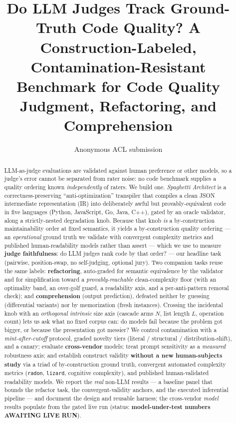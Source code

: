 \documentclass[11pt]{article}
\title{Do LLM Judges Track Ground-Truth Code Quality? A Construction-Labeled,
 Contamination-Resistant Benchmark for Code Quality Judgment, Refactoring, and
 Comprehension}
\author{Anonymous ACL submission}
\begin{document}
\maketitle

\begin{abstract}
LLM-as-judge evaluations are validated against human preference or other models, so a
judge's error cannot be separated from rater noise: no code benchmark supplies a quality
ordering known \emph{independently} of raters. We build one. \emph{Spaghetti Architect}
is a correctness-preserving ``anti-optimization'' transpiler that compiles a clean JSON
intermediate representation (IR) into deliberately awful but provably-equivalent code in
five languages (Python, JavaScript, Go, Java, C++), gated by an oracle validator, along a
strictly-nested degradation knob. Because that knob \emph{is} a by-construction
maintainability order at fixed semantics, it yields a by-construction quality ordering ---
an \emph{operational} ground truth we validate with convergent complexity metrics and
published human-readability models rather than assert --- which we use to measure
\textbf{judge faithfulness}: do LLM judges rank code by that order? --- our headline task
(pairwise, position-swap, no self-judging, optional jury). Two
companion tasks reuse the same labels: \textbf{refactoring}, auto-graded for semantic
equivalence by the validator and for simplification toward a \emph{provably-reachable}
clean-complexity floor (with an optimality band, an over-golf guard, a readability axis,
and a per-anti-pattern removal check); and \textbf{comprehension} (output prediction),
defeated neither by guessing (differential variants) nor by memorization (fresh
instances). Crossing the incidental knob with an \emph{orthogonal intrinsic} size axis
(cascade arms $N$, list length $L$, operation count) lets us ask what no fixed corpus
can: do models fail because the problem got bigger, or because the presentation got
messier? We control contamination with a \emph{mint-after-cutoff} protocol, graded
novelty tiers (literal / structural / distribution-shift), and a canary; evaluate
\textbf{cross-vendor} models; treat prompt sensitivity as a \emph{measured} robustness
axis; and establish construct validity \textbf{without a new human-subjects study} via a
triad of by-construction ground truth, convergent automated complexity metrics
(\texttt{radon}, \texttt{lizard}, cognitive complexity), and published human-validated
readability models. We report the \emph{real} non-LLM results --- a baseline panel that
bounds the refactor task, the convergent-validity anchors, and the executed inferential
pipeline --- and document the design and reusable harness; the cross-vendor \emph{model}
results populate from the gated live run (status: \textbf{model-under-test numbers AWAITING
LIVE RUN}).
\end{abstract}
\end{document}
